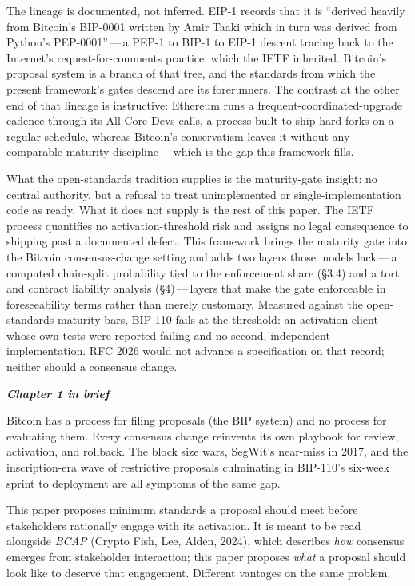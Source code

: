 \documentclass[11pt, twoside, openright]{book}
\newcommand{\sect}[1]{\S#1}
\newcommand{\peheader}[1]{{\itshape\bfseries #1}\par\vspace{4pt}}
\begin{document}
The lineage is documented, not inferred. EIP-1 records that it is ``derived heavily from Bitcoin's BIP-0001 written by Amir Taaki which in turn was derived from Python's PEP-0001''\,---\,a PEP-1 to BIP-1 to EIP-1 descent tracing back to the Internet's request-for-comments practice, which the IETF inherited. Bitcoin's proposal system is a branch of that tree, and the standards from which the present framework's gates descend are its forerunners. The contrast at the other end of that lineage is instructive: Ethereum runs a frequent-coordinated-upgrade cadence through its All Core Devs calls, a process built to ship hard forks on a regular schedule, whereas Bitcoin's conservatism leaves it without any comparable maturity discipline\,---\,which is the gap this framework fills.

What the open-standards tradition supplies is the maturity-gate insight: no central authority, but a refusal to treat unimplemented or single-implementation code as ready. What it does not supply is the rest of this paper. The IETF process quantifies no activation-threshold risk and assigns no legal consequence to shipping past a documented defect. This framework brings the maturity gate into the Bitcoin consensus-change setting and adds two layers those models lack\,---\,a computed chain-split probability tied to the enforcement share (\sect{3.4}) and a tort and contract liability analysis (\sect{4})\,---\,layers that make the gate enforceable in foreseeability terms rather than merely customary. Measured against the open-standards maturity bars, BIP-110 fails at the threshold: an activation client whose own tests were reported failing and no second, independent implementation. RFC 2026 would not advance a specification on that record; neither should a consensus change.

\needspace{2.5in}
\begin{plainenglish}
\peheader{Chapter 1 in brief}

Bitcoin has a process for filing proposals (the BIP system) and no process for evaluating them. Every consensus change reinvents its own playbook for review, activation, and rollback. The block size wars, SegWit's near-miss in 2017, and the inscription-era wave of restrictive proposals culminating in BIP-110's six-week sprint to deployment are all symptoms of the same gap.

This paper proposes minimum standards a proposal should meet before stakeholders rationally engage with its activation. It is meant to be read alongside \textit{BCAP} (Crypto Fish, Lee, Alden, 2024), which describes \textit{how} consensus emerges from stakeholder interaction; this paper proposes \textit{what} a proposal should look like to deserve that engagement. Different vantages on the same problem.
\end{plainenglish}
\end{document}
